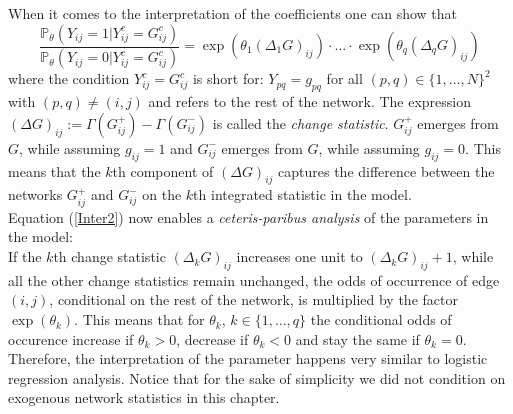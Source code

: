 \documentclass[headsepline=true, abstracton]{scrartcl}
\begin{document}
When it comes to the interpretation of the coefficients one can show that
\begin{equation}
\frac{\mathbb{P}_{\theta}(Y_{ij}=1 | Y_{ij}^c=G_{ij}^c)}{\mathbb{P}_{\theta}(Y_{ij}=0 | Y_{ij}^c=G_{ij}^c)}
= \exp(\theta_1 (\Delta_1 G)_{ij}) \cdot ... \cdot \exp( \theta_q (\Delta_q G)_{ij})
\label{Inter2}
\end{equation}
where the condition $Y_{ij}^c=G_{ij}^c$ is short for: $Y_{pq}=g_{pq}$ for all $(p,q)\in \{1,\dots,N\}^2$ with $(p,q) \neq (i,j)$ and refers to the rest of the network.
The expression $(\Delta G)_{ij}:=\Gamma(G_{ij}^+) - \Gamma(G_{ij}^-)$ is called the \textit{change statistic}. $G_{ij}^+$ emerges from $G$, while assuming $g_{ij}=1$ and $G_{ij}^-$ emerges from $G$, while assuming $g_{ij}=0$. This means that the $k$th component of $(\Delta G)_{ij}$ captures the difference between the networks $G_{ij}^+$ and $G_{ij}^-$ on the $k$th integrated statistic in the model.\\[0.3cm]
Equation (\ref{Inter2}) now enables a \textit{ceteris-paribus analysis} of the parameters in the model:\\
If the $k$th change statistic $(\Delta_k G)_{ij}$ increases one unit to $(\Delta_k G)_{ij}+1$, while all the other change statistics remain unchanged, the odds of occurrence of edge $(i,j)$, conditional on the rest of the network, is multiplied by the factor $\exp(\theta_k)$. This means that for $\theta_k$, $k \in \{1, \ldots , q\}$ the conditional odds of occurence increase if $\theta_k > 0 $, decrease if $\theta_k < 0 $ and stay the same if $\theta_k = 0 $. 
Therefore, the interpretation of the parameter happens very similar to logistic regression analysis. 
Notice that for the sake of simplicity we did not condition on exogenous network statistics in this chapter.
\end{document}
